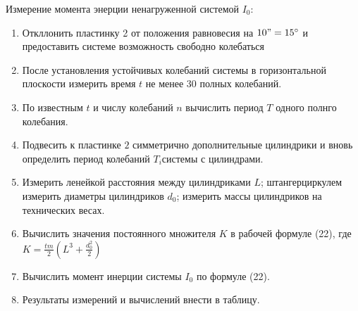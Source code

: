 
    \item Измерение момента энерции ненагруженной системой $I_0$:
    \begin{enumerate}
        \item Откллонить пластинку 2 от положения равновесия на $10"=15^\circ$
        и предоставить системе возможность свободно колебаться
        \item После установления устойчивых колебаний системы в горизонтальной
        плоскости измерить время $t$ не менее 30 полных колебаний.
        \item По известным $t$ и числу колебаний $n$ вычислить период $T$ одного полнго колебания.
        \item Подвесить к пластинке $2$ симметрично дополнительные цилиндрики и вновь определить
        период колебаний $T_i$системы с цилиндрами.
        \item Измерить ленейкой расстояния между цилиндриками $L$;
        штангерциркулем измерить диаметры цилиндриков $d_0$;
        измерить массы цилиндриков на технических весах.
        \item Вычислить значения постоянного множителя $K$ в рабочей формуле (22),
        где $K = \frac{tm}{2}(L^3 + \frac{d_0^2}{2})$
        \item Вычислить момент инерции системы $I_0$ по формуле (22).
        \item Результаты измерений и вычислений внести в таблицу.
    \end{enumerate} 